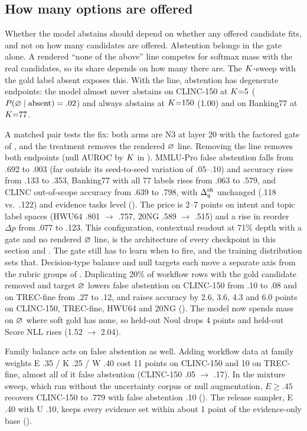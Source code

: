 \subsection{How many options are offered}
\label{sec:analysis:null}

Whether the model abstains should depend on whether any offered candidate fits, and not on how many
candidates are offered. Abstention belongs in the gate alone. A rendered ``none of the above'' line
competes for softmax mass with the real candidates, so its share depends on how many there are. The
$K$-sweep with the gold label absent exposes this. With the line, abstention has degenerate
endpoints: the model almost never abstains on CLINC-150 at $K{=}5$ ($P(\varnothing \mid
\text{absent}) = .02$) and always abstains at $K{=}150$ (1.00) and on Banking77 at
$K{=}77$.

A matched pair tests the fix: both arms are N3 at layer 20 with the factored gate of
, and the treatment removes the rendered $\varnothing$ line. Removing the line
removes both endpoints (null AUROC by $K$ in ). MMLU-Pro false
abstention falls from .692 to .003 (far outside its seed-to-seed variation of .05--.10) and accuracy
rises from .133 to .353, Banking77 with all 77 labels rises from .063 to .579, and CLINC out-of-scope
accuracy from .639 to .798, with $\Delta_q^{\mathrm{sh}}$ unchanged (.118 vs.\ .122) and evidence tasks level
(). The price is 2--7 points on intent and
topic label spaces (HWU64 .801 $\to$ .757, 20NG .589 $\to$ .515) and a rise in reorder $\Delta p$ from
.077 to .123. This configuration, contextual readout at 71\% depth with a gate and no rendered
$\varnothing$ line, is the architecture of every checkpoint in this section and .
The gate still has to learn when to fire, and the training distribution sets that. Decision-type
balance and null targets each move a separate axis from the rubric groups of .
Duplicating 20\% of workflow rows with the gold candidate removed and target $\varnothing$ lowers false
abstention on CLINC-150 from .10 to .08 and on TREC-fine from .27 to .12, and raises accuracy by 2.6,
3.6, 4.3 and 6.0 points on CLINC-150, TREC-fine, HWU64 and 20NG (). The model now spends mass
on $\varnothing$ where soft gold has none, so held-out Noul drops 4 points and held-out Score NLL rises
(1.52 $\to$ 2.04).

Family balance acts on false abstention as well. Adding workflow data at family weights E .35 /
K .25 / W .40 cost 11 points on CLINC-150 and 10 on TREC-fine, almost all of it false abstention
(CLINC-150 .05 $\to$ .17). In the mixture sweep, which ran without the uncertainty corpus or null
augmentation, $E \ge .45$ recovers CLINC-150 to .779 with false abstention .10 (). The release sampler, E .40 with
U .10, keeps every evidence set within about 1 point of the evidence-only base ().

